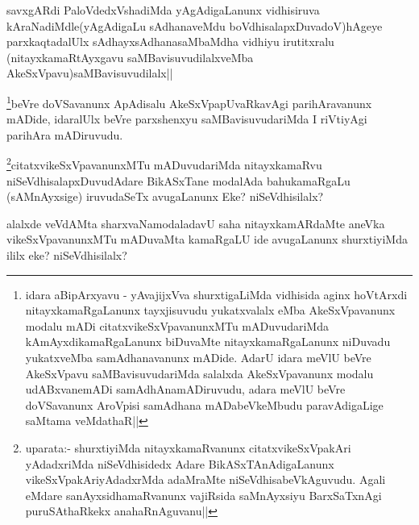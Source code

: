\begin{artha}
savxgARdi PaloVdedxVshadiMda yAgAdigaLanunx vidhisiruva kAraNadiMdle(yAgAdigaLu sAdhanaveMdu boVdhisalapxDuvadoV)hAgeye parxkaqtadalUlx sAdhayxsAdhanasaMbaMdha vidhiyu irutitxralu (nitayxkamaRtAyxgavu saMBavisuvudilalxveMba AkeSxVpavu)saMBavisuvudilalx||
\end{artha}


\begin{artha}
\footnote{idara aBipArxyavu - yAvajijxVva shurxtigaLiMda vidhisida aginx hoVtArxdi nitayxkamaRgaLanunx tayxjisuvudu yukatxvalalx eMba AkeSxVpavanunx modalu mADi citatxvikeSxVpavanunxMTu mADuvudariMda kAmAyxdikamaRgaLanunx biDuvaMte nitayxkamaRgaLanunx niDuvadu yukatxveMba samAdhanavanunx mADide. AdarU idara meVlU beVre AkeSxVpavu saMBavisuvudariMda salalxda AkeSxVpavanunx modalu udABxvanemADi samAdhAnamADiruvudu, adara meVlU beVre doVSavanunx AroVpisi samAdhana mADabeVkeMbudu  paravAdigaLige saMtama veMdathaR||}beVre doVSavanunx ApAdisalu AkeSxVpapUvaRkavAgi parihAravanunx mADide, idaralUlx beVre parxshenxyu saMBavisuvudariMda I riVtiyAgi parihAra mADiruvudu.
\end{artha}

\begin{artha}
\footnote{uparata:- shurxtiyiMda nitayxkamaRvanunx citatxvikeSxVpakAri yAdadxriMda niSeVdhisidedx Adare BikASxTAnAdigaLanunx vikeSxVpakAriyAdadxrMda  adaMraMte niSeVdhisabeVkAguvudu. Agali eMdare sanAyxsidhamaRvanunx vajiRsida saMnAyxsiyu BarxSaTxnAgi puruSAthaRkekx anahaRnAguvanu||}citatxvikeSxVpavanunxMTu mADuvudariMda nitayxkamaRvu niSeVdhisalapxDuvudAdare BikASxTane modalAda bahukamaRgaLu (sAMnAyxsige) iruvudaSeTx avugaLanunx Eke? niSeVdhisilalx?
\end{artha}


\begin{artha}
alalxde veVdAMta sharxvaNamodaladavU saha nitayxkamARdaMte aneVka vikeSxVpavanunxMTu mADuvaMta kamaRgaLU ide avugaLanunx shurxtiyiMda ililx eke? niSeVdhisilalx?
\end{artha}

